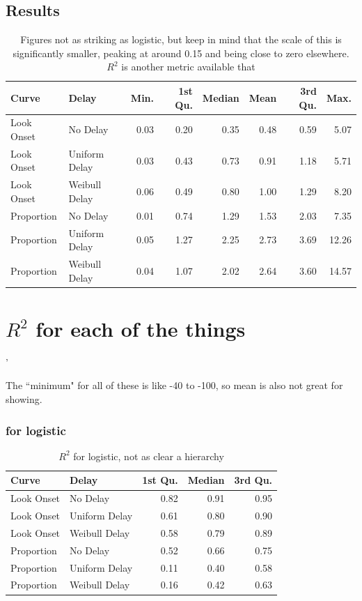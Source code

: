 \documentclass{article}
\begin{document}
\subsection{Results}

\begin{table}[ht]
\centering
\begin{tabular}{llrrrrrr}
  \hline
Curve & Delay & Min. & 1st Qu. & Median & Mean & 3rd Qu. & Max. \\ 
  \hline
Look Onset & No Delay & 0.03 & 0.20 & 0.35 & 0.48 & 0.59 & 5.07 \\ 
  Look Onset & Uniform Delay & 0.03 & 0.43 & 0.73 & 0.91 & 1.18 & 5.71 \\ 
  Look Onset & Weibull Delay & 0.06 & 0.49 & 0.80 & 1.00 & 1.29 & 8.20 \\ 
  Proportion & No Delay & 0.01 & 0.74 & 1.29 & 1.53 & 2.03 & 7.35 \\ 
  Proportion & Uniform Delay & 0.05 & 1.27 & 2.25 & 2.73 & 3.69 & 12.26 \\ 
  Proportion & Weibull Delay & 0.04 & 1.07 & 2.02 & 2.64 & 3.60 & 14.57 \\ 
   \hline
\end{tabular}
\caption{Figures not as striking as logistic, but keep in mind that the scale of this is significantly smaller, peaking at around 0.15 and being close to zero elsewhere. $R^2$ is another metric available that }
\end{table}

\section*{$R^2$ for each of the things}'

The ``minimum" for all of these is like -40 to -100, so mean is also not great for showing.

\subsubsection{for logistic}

\begin{table}[H]
\centering
\begin{tabular}{llrrr}
  \hline
Curve & Delay & 1st Qu. & Median & 3rd Qu. \\ 
  \hline
Look Onset & No Delay & 0.82 & 0.91 & 0.95 \\ 
  Look Onset & Uniform Delay & 0.61 & 0.80 & 0.90 \\ 
  Look Onset & Weibull Delay & 0.58 & 0.79 & 0.89 \\ 
  Proportion & No Delay & 0.52 & 0.66 & 0.75 \\ 
  Proportion & Uniform Delay & 0.11 & 0.40 & 0.58 \\ 
  Proportion & Weibull Delay & 0.16 & 0.42 & 0.63 \\ 
   \hline
\end{tabular}
\caption{$R^2$ for logistic, not as clear a hierarchy}
\end{table}
\end{document}

